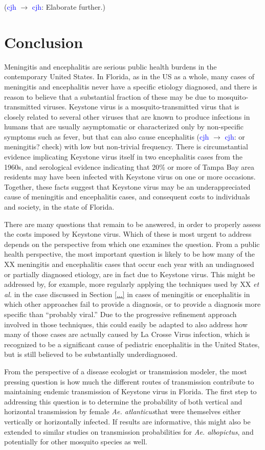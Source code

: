\documentclass[12pt]{article}
\newcommand{\alb}{\textit{Ae. albopictus}}
\newcommand{\atl}{\textit{Ae. atlanticus}}
\newcommand{\cjh}{\textcolor{blue}{cjh}}
\newcommand{\msg}[3]{(#1 $\rightarrow$ #2: #3)}
\newcommand{\mcc}[1]{\msg\cjh\cjh{#1}}
\begin{document}
            \mcc{Elaborate further.}

    \section{Conclusion}
        Meningitis and encephalitis are serious public health burdens in the contemporary United States. In Florida, as in the US as a whole, many cases of meningitis and encephalitis never have a specific etiology diagnosed, and there is reason to believe that a substantial fraction of these may be due to mosquito-transmitted viruses. Keystone virus is a mosquito-transmitted virus that is closely related to several other viruses that are known to produce infections in humans that are usually asymptomatic or characterized only by non-specific symptoms such as fever, but that can also cause encephalitis \mcc{or meningitis? check} with low but non-trivial frequency. There is circumstantial evidence implicating Keystone virus itself in two encephalitis cases from the 1960s, and serological evidence indicating that 20\% or more of Tampa Bay area residents may have been infected with Keystone virus on one or more occasions. Together, these facts suggest that Keystone virus may be an underappreciated cause of meningitis and encephalitis cases, and consequent costs to individuals and society, in the state of Florida.

        There are many questions that remain to be answered, in order to properly assess the costs imposed by Keystone virus. Which of these is most urgent to address depends on the perspective from which one examines the question. From a public health perspective, the most important question is likely to be how many of the XX meningitis and encephalitis cases that occur each year with an undiagnosed or partially diagnosed etiology, are in fact due to Keystone virus. This might be addressed by, for example, more regularly applying the techniques used by XX \textit{et al.}\cite{...} in the case discussed in Section \ref{...} in cases of meningitis or encephalitis in which other approaches fail to provide a diagnosis, or to provide a diagnosis more specific than ``probably viral.'' Due to the progressive refinement approach involved in those techniques, this could easily be adapted to also address how many of those cases are actually caused by La Crosse Virus infection, which is recognized to be a significant cause of pediatric encephalitis in the United States, but is still believed to be substantially underdiagnosed.

        From the perspective of a disease ecologist or transmission modeler, the most pressing question is how much the different routes of transmission contribute to maintaining endemic transmission of Keystone virus in Florida. The first step to addressing this question is to determine the probability of both vertical and horizontal transmission by female \atl that were themselves either vertically or horizontally infected. If results are informative, this might also be extended to similar studies on transmission probabilities for \alb, and potentially for other mosquito species as well.
\end{document}
